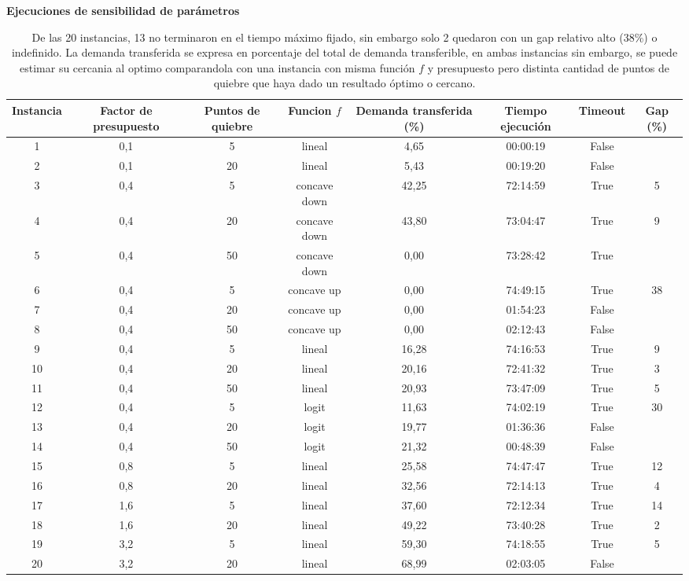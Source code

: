\documentclass{article}
\begin{document}
  \begin{table}
    \centering
    \caption*{{\bf Ejecuciones de sensibilidad de parámetros}}
    \begin{tabular}{cccccccc}
        \toprule
        Instancia & Factor de presupuesto & Puntos de quiebre & Funcion $f$ & Demanda transferida (\%) & Tiempo ejecución & Timeout & Gap (\%) \\
        \midrule
        1 & 0,1 & 5 & lineal & 4,65 & 00:00:19 & False &  \\
        2 & 0,1 & 20 & lineal & 5,43 & 00:19:20 & False &  \\
        3 & 0,4 & 5 & concave down & 42,25 & 72:14:59 & True & 5 \\
        4 & 0,4 & 20 & concave down & 43,80 & 73:04:47 & True & 9 \\
        5 & 0,4 & 50 & concave down & 0,00 & 73:28:42 & True &  \\
        6 & 0,4 & 5 & concave up & 0,00 & 74:49:15 & True & 38 \\
        7 & 0,4 & 20 & concave up & 0,00 & 01:54:23 & False &  \\
        8 & 0,4 & 50 & concave up & 0,00 & 02:12:43 & False &  \\
        9 & 0,4 & 5 & lineal & 16,28 & 74:16:53 & True & 9 \\
        10 & 0,4 & 20 & lineal & 20,16 & 72:41:32 & True & 3 \\
        11 & 0,4 & 50 & lineal & 20,93 & 73:47:09 & True & 5 \\
        12 & 0,4 & 5 & logit & 11,63 & 74:02:19 & True & 30 \\
        13 & 0,4 & 20 & logit & 19,77 & 01:36:36 & False &  \\
        14 & 0,4 & 50 & logit & 21,32 & 00:48:39 & False &  \\
        15 & 0,8 & 5 & lineal & 25,58 & 74:47:47 & True & 12 \\
        16 & 0,8 & 20 & lineal & 32,56 & 72:14:13 & True & 4 \\
        17 & 1,6 & 5 & lineal & 37,60 & 72:12:34 & True & 14 \\
        18 & 1,6 & 20 & lineal & 49,22 & 73:40:28 & True & 2 \\
        19 & 3,2 & 5 & lineal & 59,30 & 74:18:55 & True & 5 \\
        20 & 3,2 & 20 & lineal & 68,99 & 02:03:05 & False &  \\
        \bottomrule
    \end{tabular}
      \caption{De las 20 instancias, 13 no terminaron en el tiempo máximo fijado, sin embargo solo 2 quedaron con un gap relativo alto (38\%) o indefinido. La demanda transferida se expresa en porcentaje del total de demanda transferible, en ambas instancias sin embargo, se puede estimar su cercania al optimo comparandola con una instancia con misma función $f$ y presupuesto pero distinta cantidad de puntos de quiebre que haya dado un resultado óptimo o cercano.} \label{table:sensibilityresults}
  \end{table}
\end{document}
